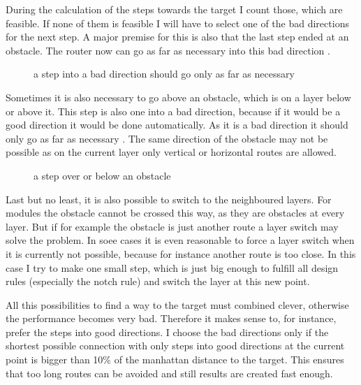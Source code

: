 During the calculation of the steps towards the target I count those, which are feasible. If none of them is feasible I will have to select one of the bad directions for the next step. A major premise for this is also that the last step ended at an obstacle. The router now can go as far as necessary into this bad direction .

\begin{figure}
	\centering
	
 	\caption{a step into a bad direction should go only as far as necessary}
	\label{fig:router_as_far_as_necessary}
\end{figure}

Sometimes it is also necessary to go above an obstacle, which is on a layer below or above it. This step is also one into a bad direction, because if it would be a good direction it would be done automatically. As it is a bad direction it should only go as far as necessary . The same direction of the obstacle may not be possible as on the current layer only vertical or horizontal routes are allowed.

\begin{figure}
	\centering
	
 	\caption{a step over or below an obstacle}
	\label{fig:router_as_far_as_necessary_above}
\end{figure}

Last but no least, it is also possible to switch to the neighboured layers. For modules the obstacle cannot be crossed this way, as they are obstacles at every layer. But if for example the obstacle is just another route a layer switch may solve the problem. In soee cases it is even reasonable to force a layer switch when it is currently not possible, because for instance another route is too close. In this case I try to make one small step, which is just big enough to fulfill all design rules (especially the notch rule) and switch the layer at this new point.

All this possibilities to find a way to the target must combined clever, otherwise the performance becomes very bad. Therefore it makes sense to, for instance, prefer the steps into good directions. I choose the bad directions only if the shortest possible connection with only steps into good directions at the current point is bigger than 10\% of the manhattan distance to the target. This ensures that too long routes can be avoided and still results are created fast enough.

